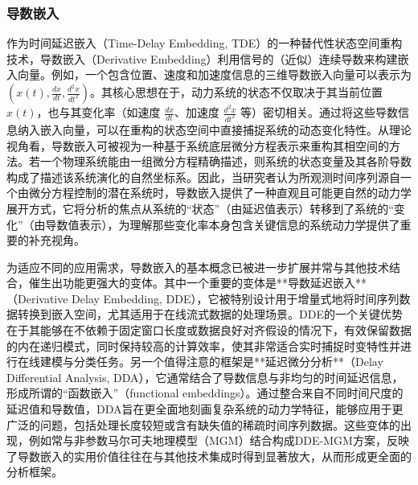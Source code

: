 \subsubsection{导数嵌入}
作为时间延迟嵌入（Time-Delay Embedding, TDE）的一种替代性状态空间重构技术，导数嵌入（Derivative Embedding）利用信号的（近似）连续导数来构建嵌入向量。例如，一个包含位置、速度和加速度信息的三维导数嵌入向量可以表示为 $(x(t), \frac{dx}{dt}, \frac{d^2x}{dt^2})$。其核心思想在于，动力系统的状态不仅取决于其当前位置 $x(t)$，也与其变化率（如速度 $\frac{dx}{dt}$、加速度 $\frac{d^2x}{dt^2}$ 等）密切相关。通过将这些导数信息纳入嵌入向量，可以在重构的状态空间中直接捕捉系统的动态变化特性。从理论视角看，导数嵌入可被视为一种基于系统底层微分方程表示来重构其相空间的方法。若一个物理系统能由一组微分方程精确描述，则系统的状态变量及其各阶导数构成了描述该系统演化的自然坐标系。因此，当研究者认为所观测时间序列源自一个由微分方程控制的潜在系统时，导数嵌入提供了一种直观且可能更自然的动力学展开方式，它将分析的焦点从系统的“状态”（由延迟值表示）转移到了系统的“变化”（由导数值表示），为理解那些变化率本身包含关键信息的系统动力学提供了重要的补充视角。

为适应不同的应用需求，导数嵌入的基本概念已被进一步扩展并常与其他技术结合，催生出功能更强大的变体。其中一个重要的变体是**导数延迟嵌入**（Derivative Delay Embedding, DDE），它被特别设计用于增量式地将时间序列数据转换到嵌入空间，尤其适用于在线流式数据的处理场景。DDE的一个关键优势在于其能够在不依赖于固定窗口长度或数据良好对齐假设的情况下，有效保留数据的内在递归模式，同时保持较高的计算效率，使其非常适合实时捕捉时变特性并进行在线建模与分类任务。另一个值得注意的框架是**延迟微分分析**（Delay Differential Analysis, DDA），它通常结合了导数信息与非均匀的时间延迟信息，形成所谓的“函数嵌入”（functional embeddings）。通过整合来自不同时间尺度的延迟值和导数值，DDA旨在更全面地刻画复杂系统的动力学特征，能够应用于更广泛的问题，包括处理长度较短或含有缺失值的稀疏时间序列数据。这些变体的出现，例如常与非参数马尔可夫地理模型（MGM）结合构成DDE-MGM方案，反映了导数嵌入的实用价值往往在与其他技术集成时得到显著放大，从而形成更全面的分析框架。

